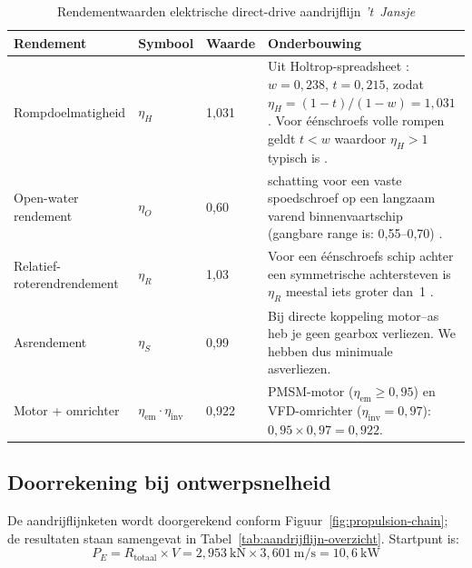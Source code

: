 \begin{table}[H]
\centering
\caption{Rendementwaarden elektrische direct-drive aandrijflijn \emph{'t~Jansje}}
\label{tab:rendementen}
\begin{tabular}{p{3.2cm} l l p{7.0cm}}
\toprule
Rendement & Symbool & Waarde & Onderbouwing \\
\midrule
Rompdoelmatigheid
    & $\eta_H$ & 1{,}031
    & Uit Holtrop-spreadsheet \cite{spreadsheet_holtrop}:
      $w = 0{,}238$, $t = 0{,}215$, zodat
      $\eta_H = (1-t)/(1-w) = 1{,}031$.
      Voor éénschroefs volle rompen geldt $t < w$
      waardoor $\eta_H > 1$ typisch is \cite{Molland2011}. \\[4pt]
Open-water rendement
    & $\eta_O$ & 0{,}60
    &  schatting voor een vaste spoedschroef
      op een langzaam varend binnenvaartschip
      (gangbare range is: 0{,}55--0{,}70) \cite{Molland2011}. \\[4pt]
Relatief-roterendrendement
    & $\eta_R$ & 1{,}03
    & Voor een éénschroefs schip achter een symmetrische
      achtersteven is $\eta_R$ meestal iets groter dan~1
       \cite{Molland2011}. \\[4pt]
Asrendement
    & $\eta_S$ & 0{,}99
    & Bij directe koppeling motor--as heb je geen gearbox verliezen. We hebben dus minimuale asverliezen. \\[4pt]
Motor + omrichter
    & $\eta_\mathrm{em} \cdot \eta_\mathrm{inv}$ & 0{,}922
    & PMSM-motor ($\eta_\mathrm{em} \geq 0{,}95$) en
      VFD-omrichter ($\eta_\mathrm{inv} = 0{,}97$):
      $0{,}95 \times 0{,}97 = 0{,}922$. \\
\bottomrule
\end{tabular}
\end{table}

\subsection{Doorrekening bij ontwerpsnelheid}
\label{subsec:aandrijflijn-berekening}

De aandrijflijnketen wordt doorgerekend conform
Figuur~\ref{fig:propulsion-chain}; de resultaten staan samengevat in
Tabel~\ref{tab:aandrijflijn-overzicht}. Startpunt is:
\begin{equation}
    P_E = R_\mathrm{totaal} \times V
        = 2{,}953\ \mathrm{kN} \times 3{,}601\ \mathrm{m/s}
        = 10{,}6\ \mathrm{kW}
\end{equation}


